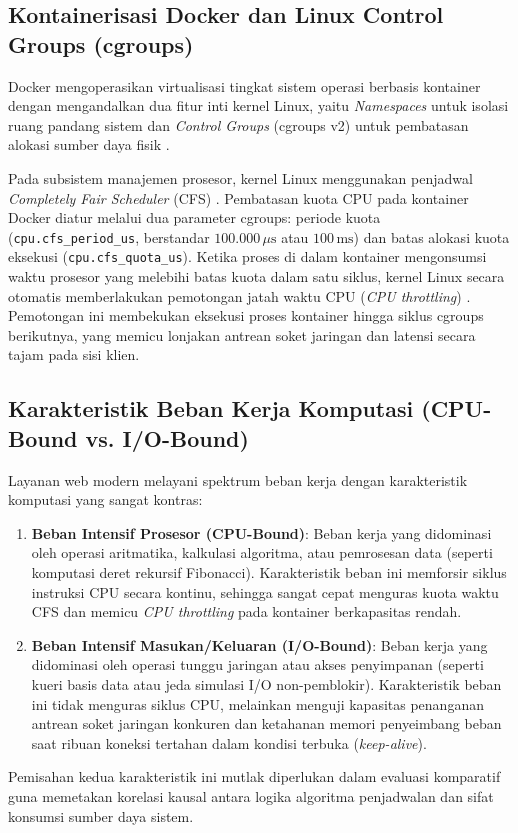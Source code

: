 \subsection[Kontainerisasi Docker dan Linux cgroups]{Kontainerisasi Docker dan Linux Control Groups (cgroups)}
Docker mengoperasikan virtualisasi tingkat sistem operasi berbasis kontainer dengan mengandalkan dua fitur inti kernel Linux, yaitu \textit{Namespaces} untuk isolasi ruang pandang sistem dan \textit{Control Groups} (cgroups v2) untuk pembatasan alokasi sumber daya fisik \citep{khan2026decomposing, gurramkonda2026docker}.

Pada subsistem manajemen prosesor, kernel Linux menggunakan penjadwal \textit{Completely Fair Scheduler} (CFS) \citep{shetty2025cpu}. Pembatasan kuota CPU pada kontainer Docker diatur melalui dua parameter cgroups: periode kuota (\texttt{cpu.cfs\_}\allowbreak\texttt{period\_us}, berstandar $100.000\,\mu\text{s}$ atau $100\,\text{ms}$) dan batas alokasi kuota eksekusi (\texttt{cpu.cfs\_}\allowbreak\texttt{quota\_us}). Ketika proses di dalam kontainer mengonsumsi waktu prosesor yang melebihi batas kuota dalam satu siklus, kernel Linux secara otomatis memberlakukan pemotongan jatah waktu CPU (\textit{CPU throttling}) \citep{shetty2025cpu}. Pemotongan ini membekukan eksekusi proses kontainer hingga siklus cgroups berikutnya, yang memicu lonjakan antrean soket jaringan dan latensi secara tajam pada sisi klien.

\subsection[Karakteristik Beban Kerja CPU-Bound dan I/O-Bound]{Karakteristik Beban Kerja Komputasi (CPU-Bound vs. I/O-Bound)}
Layanan web modern melayani spektrum beban kerja dengan karakteristik komputasi yang sangat kontras:
\begin{enumerate}
    \item \textbf{Beban Intensif Prosesor (CPU-Bound)}: Beban kerja yang didominasi oleh operasi aritmatika, kalkulasi algoritma, atau pemrosesan data (seperti komputasi deret rekursif Fibonacci). Karakteristik beban ini memforsir siklus instruksi CPU secara kontinu, sehingga sangat cepat menguras kuota waktu CFS dan memicu \textit{CPU throttling} pada kontainer berkapasitas rendah.
    \item \textbf{Beban Intensif Masukan/Keluaran (I/O-Bound)}: Beban kerja yang didominasi oleh operasi tunggu jaringan atau akses penyimpanan (seperti kueri basis data atau jeda simulasi I/O non-pemblokir). Karakteristik beban ini tidak menguras siklus CPU, melainkan menguji kapasitas penanganan antrean soket jaringan konkuren dan ketahanan memori penyeimbang beban saat ribuan koneksi tertahan dalam kondisi terbuka (\textit{keep-alive}).
\end{enumerate}
Pemisahan kedua karakteristik ini mutlak diperlukan dalam evaluasi komparatif guna memetakan korelasi kausal antara logika algoritma penjadwalan dan sifat konsumsi sumber daya sistem.

